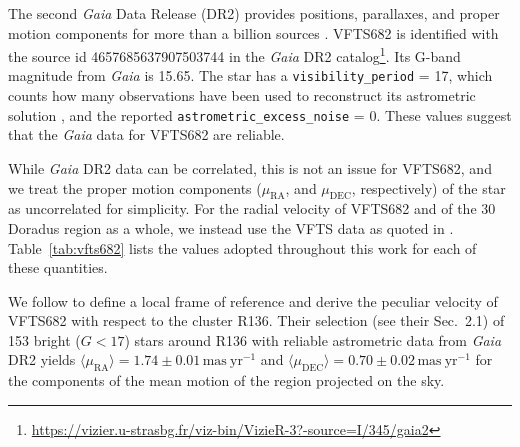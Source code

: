 \documentclass[apjl,twocolumn]{emulateapj}
\DeclareRobustCommand{\Tabref}[1]{Table~\ref{#1}}
\begin{document}
The second \emph{Gaia} Data Release (DR2) %
provides positions,
parallaxes, and proper motion components for more than a billion
sources \citep{brown:18}. VFTS682 is identified with the source id 4657685637907503744 in the \emph{Gaia} DR2
catalog\footnote{\url{https://vizier.u-strasbg.fr/viz-bin/VizieR-3?-source=I/345/gaia2}}. Its
G-band magnitude from \emph{Gaia}
is 15.65. The star has a
\texttt{visibility\_period} = 17, which counts how many observations have
been used to reconstruct its astrometric solution
\citep[][]{lindengren:18}, and the reported
\texttt{astrometric\_excess\_noise} = 0. These values suggest that the \emph{Gaia}
data for VFTS682 are reliable. %

While \emph{Gaia} DR2 data can be correlated, this is
not an issue for VFTS682, and we treat the proper motion components ($\mu_\mathrm{RA}$, and $\mu_\mathrm{DEC}$,
respectively) of the star as uncorrelated for simplicity.
For the radial velocity of VFTS682 and of the 30 Doradus
region as a whole, we instead use the VFTS data
as quoted in \cite{bestenlehner:11}. \Tabref{tab:vfts682} lists the values adopted throughout
this work for each of these quantities.

We follow \citet{lennon:18} to define a local frame of reference and derive the peculiar velocity
of VFTS682 with respect to the cluster R136. Their selection (see
their Sec.~2.1) of 153
bright ($G<17$) stars around R136 with reliable astrometric data from
\emph{Gaia} DR2 yields $\langle\mu_\mathrm{RA}\rangle=1.74\pm0.01\,\mathrm{mas\
  yr^{-1}}$ and $\langle\mu_\mathrm{DEC}\rangle=0.70\pm0.02\,\mathrm{mas\ yr^{-1}}$
for the components of the mean motion of the region projected on the sky.
\end{document}

